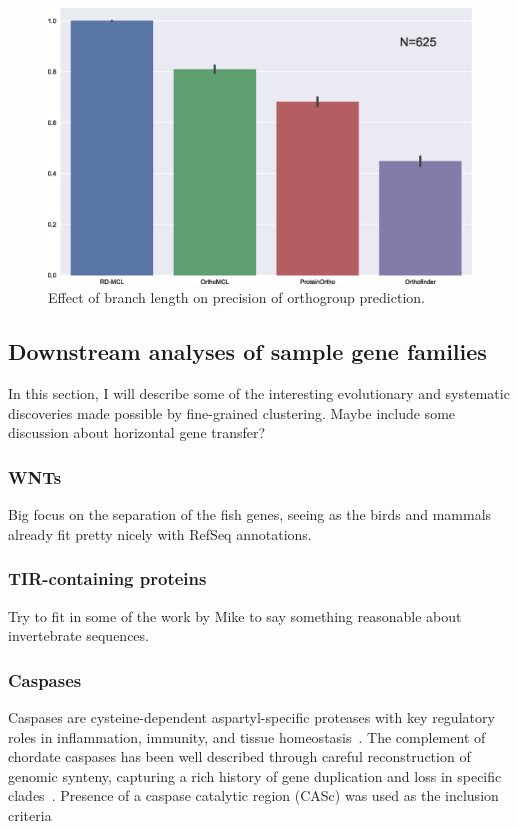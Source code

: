 \documentclass[twocolumn]{bmcart}  %
\begin{document}
\begin{figure}[t]
  \begin{center}
  \includegraphics[height=0.22\textheight]{../figures/branch_len_bargraph.eps}
\end{center}
\caption{Effect of branch length on precision of orthogroup prediction.}
\label{fig:branch_len_std}
\end{figure}


\subsection{Downstream analyses of sample gene families}\label{subsec:downstreamAnalysesOfSampleGeneFamilies}
In this section, I will describe some of the interesting evolutionary and systematic discoveries made possible by fine-grained clustering.
Maybe include some discussion about horizontal gene transfer?

\subsubsection{WNTs}
Big focus on the separation of the fish genes, seeing as the birds and mammals already fit pretty nicely with RefSeq annotations.


\subsubsection{TIR-containing proteins}
Try to fit in some of the work by Mike to say something reasonable about invertebrate sequences.


\subsubsection{Caspases}
Caspases are cysteine-dependent aspartyl-specific proteases with key regulatory roles in inflammation, immunity, and tissue homeostasis~\cite{Songane:2018kq,McIlwain:2013iy}.
The complement of chordate caspases has been well described through careful reconstruction of genomic synteny, capturing a rich history of gene duplication and loss in specific clades~\cite{Eckhart:2008gv,Sakamaki:2009fu,Sakamaki:2015kb,Sakata:2007bs}.
Presence of a caspase catalytic region (CASc) was used as the inclusion criteria
\end{document}
